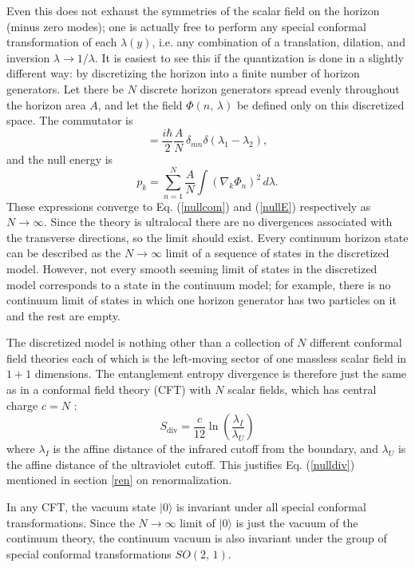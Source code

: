 \documentclass{article}
\begin{document}
Even this does not exhaust the symmetries of the scalar field on the horizon (minus zero modes); one is actually free to perform any special conformal transformation of each $\lambda(y)$, i.e. any combination of a translation, dilation, and inversion $\lambda \to 1/\lambda$.  It is easiest to see this if the quantization is done in a slightly different way: by discretizing the horizon into a finite number of horizon generators.  Let there be $N$ discrete horizon generators spread evenly throughout the horizon area $A$, and let the field $\Phi(n,\,\lambda)$ be defined only on this discretized space.  The commutator is
\begin{equation}
[\Phi(m,\,\lambda_1),\,\nabla_k \Phi(n,\,\lambda_2)] =
\frac{i\hbar}{2}\frac{A}{N}\,\delta_{mn} \delta(\lambda_1 - \lambda_2),
\end{equation}
and the null energy is
\begin{equation}
p_k = \sum_{n = 1}^N \frac{A}{N} \int (\nabla_k \Phi_n)^2 \, d\lambda.
\end{equation}
These expressions converge to Eq. (\ref{nullcom}) and (\ref{nullE}) respectively as $N \to \infty$.  Since the theory is ultralocal there are no divergences associated with the transverse directions, so the limit should exist.  Every continuum horizon state can be described as the $N \to \infty$ limit of a sequence of states in the discretized model.  However, not every smooth seeming limit of states in the discretized model corresponds to a state in the continuum model; for example,
there is no continuum limit
of states in which one horizon generator has two particles on it and the rest are empty.

The discretized model is nothing other than a collection of $N$ different conformal field theories each of which is the left-moving sector of one massless scalar field in $1+1$ dimensions.  The entanglement entropy divergence is therefore just the same as in a conformal field theory (CFT) with $N$ scalar fields, which has central charge $c = N$ \cite{ginsparg89}:
\begin{equation}
S_\mathrm{div} = \frac{c}{12} \ln \left( \frac{\lambda_I}{\lambda_U} \right)
\end{equation}
where $\lambda_I$ is the affine distance of the infrared cutoff from the boundary, and $\lambda_U$ is the affine distance of the ultraviolet cutoff.  This justifies Eq. (\ref{nulldiv}) mentioned in section \ref{ren} on renormalization.

In any CFT, the vacuum state $| 0 \rangle$ is invariant under all special conformal transformations.  Since the $N \to \infty$ limit of $| 0 \rangle$ is just the vacuum of the continuum theory, the continuum vacuum is also invariant under the group of special conformal transformations $SO(2,\,1)$.
\end{document}
